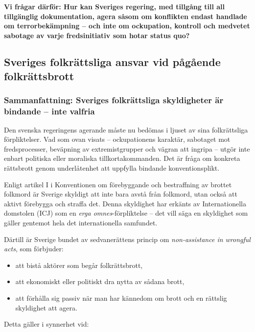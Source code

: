 \documentclass[12pt]{article}
\begin{document}
\textbf{Vi frågar därför: Hur kan Sveriges regering, med tillgång till all tillgänglig dokumentation, agera såsom om konflikten endast handlade om terrorbekämpning – och inte om ockupation, kontroll och medvetet sabotage av varje fredsinitiativ som hotar status quo?}


\subsection{Sveriges folkrättsliga ansvar vid pågående folkrättsbrott}
\subsubsection*{Sammanfattning: Sveriges folkrättsliga skyldigheter är bindande – inte valfria}

Den svenska regeringens agerande måste nu bedömas i ljuset av sina folkrättsliga förpliktelser. Vad som ovan visats – ockupationens karaktär, sabotaget mot fredsprocesser, beväpning av extremistgrupper och vägran att ingripa – utgör inte enbart politiska eller moraliska tillkortakommanden. Det är fråga om konkreta rättsbrott genom underlåtenhet att uppfylla bindande konventionsplikt.

\medskip

Enligt artikel I i Konventionen om förebyggande och bestraffning av brottet folkmord är Sverige skyldigt att inte bara avstå från folkmord, utan också att aktivt förebygga och straffa det. Denna skyldighet har erkänts av Internationella domstolen (ICJ) som en \textit{erga omnes}-förpliktelse – det vill säga en skyldighet som gäller gentemot hela det internationella samfundet.

Därtill är Sverige bundet av sedvanerättens princip om \textit{non-assistance in wrongful acts}, som förbjuder:

\begin{itemize}
  \item att bistå aktörer som begår folkrättsbrott,
  \item att ekonomiskt eller politiskt dra nytta av sådana brott,
  \item att förhålla sig passiv när man har kännedom om brott och en rättslig skyldighet att agera.
\end{itemize}

Detta gäller i synnerhet vid:
\end{document}
